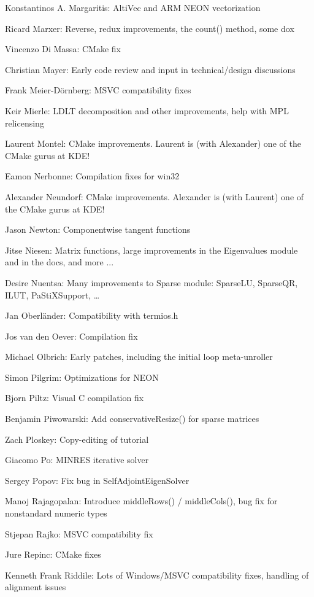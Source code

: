 Konstantinos A. Margaritis:  AltiVec and ARM NEON vectorization  

Ricard Marxer:  Reverse, redux improvements, the count() method, some dox  

Vincenzo Di Massa:  CMake fix  

Christian Mayer:  Early code review and input in technical/design discussions  

Frank Meier-Dörnberg:  MSVC compatibility fixes  

Keir Mierle:  LDLT decomposition and other improvements, help with MPL relicensing  

Laurent Montel:  CMake improvements. Laurent is (with Alexander) one of the CMake gurus at KDE!  

Eamon Nerbonne:  Compilation fixes for win32  

Alexander Neundorf:  CMake improvements. Alexander is (with Laurent) one of the CMake gurus at KDE!  

Jason Newton:  Componentwise tangent functions  

Jitse Niesen:  Matrix functions, large improvements in the Eigenvalues module and in the docs, and more ...  

Desire Nuentsa:  Many improvements to Sparse module: SparseLU, SparseQR, ILUT, PaStiXSupport, …  

Jan Oberländer:  Compatibility with termios.h  

Jos van den Oever:  Compilation fix  

Michael Olbrich:  Early patches, including the initial loop meta-unroller  

Simon Pilgrim:  Optimizations for NEON  

Bjorn Piltz:  Visual C compilation fix  

Benjamin Piwowarski:  Add conservativeResize() for sparse matrices  

Zach Ploskey:  Copy-editing of tutorial  

Giacomo Po:  MINRES iterative solver  

Sergey Popov:  Fix bug in SelfAdjointEigenSolver  

Manoj Rajagopalan:  Introduce middleRows() / middleCols(), bug fix for nonstandard numeric types  

Stjepan Rajko:  MSVC compatibility fix  

Jure Repinc:  CMake fixes  

Kenneth Frank Riddile:  Lots of Windows/MSVC compatibility fixes, handling of alignment issues  


